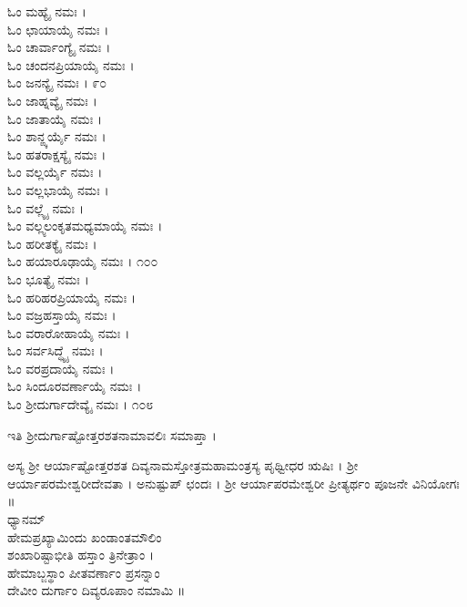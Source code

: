 \begin{multicols}{2}
ಓಂ ಮಹ್ಯೈ ನಮಃ ।\\
ಓಂ ಛಾಯಾಯೈ ನಮಃ ।\\
ಓಂ ಚಾರ್ವಾಂಗ್ಯೈ ನಮಃ ।\\
ಓಂ ಚಂದನಪ್ರಿಯಾಯೈ ನಮಃ ।\\
ಓಂ ಜನನ್ಯೈ ನಮಃ । ೯೦\\
ಓಂ ಜಾಹ್ನವ್ಯೈ ನಮಃ ।\\
ಓಂ ಜಾತಾಯೈ ನಮಃ ।\\
ಓಂ ಶಾನ್ಙ್ಕರ್ಯೈ ನಮಃ ।\\
ಓಂ ಹತರಾಕ್ಷಸ್ಯೈ ನಮಃ ।\\
ಓಂ ವಲ್ಲರ್ಯೈ ನಮಃ ।\\
ಓಂ ವಲ್ಲಭಾಯೈ ನಮಃ ।\\
ಓಂ ವಲ್ಲ್ಯೈ ನಮಃ ।\\
ಓಂ ವಲ್ಲ್ಯಲಂಕೃತಮಧ್ಯಮಾಯೈ ನಮಃ ।\\
ಓಂ ಹರೀತಕ್ಯೈ ನಮಃ ।\\
ಓಂ ಹಯಾರೂಢಾಯೈ ನಮಃ । ೧೦೦\\
ಓಂ ಭೂತ್ಯೈ ನಮಃ ।\\
ಓಂ ಹರಿಹರಪ್ರಿಯಾಯೈ ನಮಃ ।\\
ಓಂ ವಜ್ರಹಸ್ತಾಯೈ ನಮಃ ।\\
ಓಂ ವರಾರೋಹಾಯೈ ನಮಃ ।\\
ಓಂ ಸರ್ವಸಿದ್ಧ್ಯೈ ನಮಃ ।\\
ಓಂ ವರಪ್ರದಾಯೈ ನಮಃ ।\\
ಓಂ ಸಿಂದೂರವರ್ಣಾಯೈ ನಮಃ ।\\
ಓಂ ಶ್ರೀದುರ್ಗಾದೇವ್ಯೈ ನಮಃ । ೧೦೮
\end{multicols}
ಇತಿ ಶ್ರೀದುರ್ಗಾಷ್ಟೋತ್ತರಶತನಾಮಾವಲಿಃ ಸಮಾಪ್ತಾ ।

ಅಸ್ಯ ಶ್ರೀ ಆರ್ಯಾಷ್ಟೋತ್ತರಶತ ದಿವ್ಯನಾಮಸ್ತೋತ್ರಮಹಾಮಂತ್ರಸ್ಯ ಪೃಥ್ವೀಧರ ಋಷಿಃ । ಶ್ರೀ ಆರ್ಯಾಪರಮೇಶ್ವರೀದೇವತಾ । ಅನುಷ್ಟುಪ್ ಛಂದಃ । ಶ್ರೀ ಆರ್ಯಾಪರಮೇಶ್ವರೀ ಪ್ರೀತ್ಯರ್ಥಂ ಪೂಜನೇ ವಿನಿಯೋಗಃ ॥\\
ಧ್ಯಾನಮ್\\
ಹೇಮಪ್ರಖ್ಯಾಮಿಂದು ಖಂಡಾಂತಮೌಲಿಂ\\
ಶಂಖಾರಿಷ್ಟಾಭೀತಿ ಹಸ್ತಾಂ ತ್ರಿನೇತ್ರಾಂ ।\\
ಹೇಮಾಬ್ಜಸ್ಥಾಂ ಪೀತವರ್ಣಾಂ ಪ್ರಸನ್ನಾಂ\\
ದೇವೀಂ ದುರ್ಗಾಂ ದಿವ್ಯರೂಪಾಂ ನಮಾಮಿ ॥

